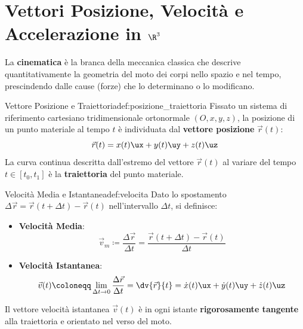 \vspace{0.5em}

\section{Vettori Posizione, Velocità e Accelerazione in $\R^3$}
\label{sec:vettori_cinematici}

La \textbf{cinematica} è la branca della meccanica classica che descrive quantitativamente la geometria del moto dei corpi nello spazio e nel tempo, prescindendo dalle cause (forze) che lo determinano o lo modificano.

\begin{definizione}{Vettore Posizione e Traiettoria}{def:posizione_traiettoria}
Fissato un sistema di riferimento cartesiano tridimensionale ortonormale $(O, x, y, z)$, la posizione di un punto materiale al tempo $t$ è individuata dal \textbf{vettore posizione} $\vec{r}(t)$:
\begin{equation}
    \vec{r}(t) = x(t)\ux + y(t)\uy + z(t)\uz
    \label{eq:vettore_posizione}
\end{equation}
La curva continua descritta dall'estremo del vettore $\vec{r}(t)$ al variare del tempo $t \in [t_0, t_1]$ è la \textbf{traiettoria} del punto materiale.
\end{definizione}

\begin{definizione}{Velocità Media e Istantanea}{def:velocita}
Dato lo spostamento $\Delta\vec{r} = \vec{r}(t+\Delta t) - \vec{r}(t)$ nell'intervallo $\Delta t$, si definisce:
\begin{itemize}
    \item \textbf{Velocità Media}:
    \begin{equation}
        \vec{v}_m \coloneqq \frac{\Delta\vec{r}}{\Delta t} = \frac{\vec{r}(t+\Delta t) - \vec{r}(t)}{\Delta t}
    \end{equation}
    \item \textbf{Velocità Istantanea}:
    \begin{equation}
        \vec{v}(t) \coloneqq \lim_{\Delta t \to 0} \frac{\Delta\vec{r}}{\Delta t} = \dv{\vec{r}}{t} = \dot{x}(t)\ux + \dot{y}(t)\uy + \dot{z}(t)\uz
        \label{eq:velocita_istantanea}
    \end{equation}
\end{itemize}
Il vettore velocità istantanea $\vec{v}(t)$ è in ogni istante \textbf{rigorosamente tangente} alla traiettoria e orientato nel verso del moto.
\end{definizione}

